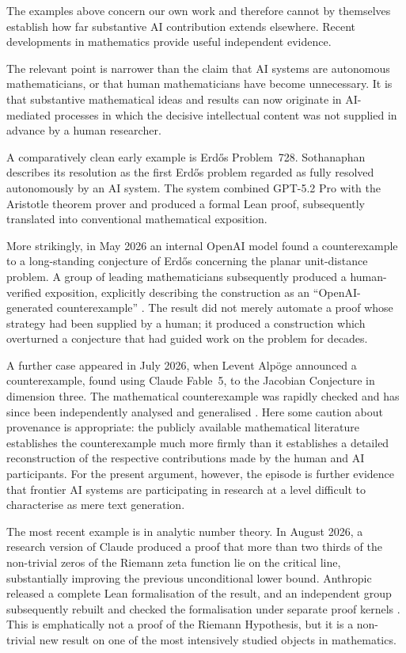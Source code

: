 The examples above concern our own work and therefore cannot by themselves establish how far substantive AI contribution extends elsewhere. Recent developments in mathematics provide useful independent evidence.

The relevant point is narrower than the claim that AI systems are autonomous mathematicians, or that human mathematicians have become unnecessary. It is that substantive mathematical ideas and results can now originate in AI-mediated processes in which the decisive intellectual content was not supplied in advance by a human researcher.

A comparatively clean early example is Erd\H{o}s Problem~728. Sothanaphan \citep{sothanaphan2026erdos728} describes its resolution as the first Erd\H{o}s problem regarded as fully resolved autonomously by an AI system. The system combined GPT-5.2 Pro with the Aristotle theorem prover and produced a formal Lean proof, subsequently translated into conventional mathematical exposition.

More strikingly, in May 2026 an internal OpenAI model found a counterexample to a long-standing conjecture of Erd\H{o}s concerning the planar unit-distance problem. A group of leading mathematicians subsequently produced a human-verified exposition, explicitly describing the construction as an ``OpenAI-generated counterexample'' \citep{alonEtAl2026unitdistance}. The result did not merely automate a proof whose strategy had been supplied by a human; it produced a construction which overturned a conjecture that had guided work on the problem for decades.

A further case appeared in July 2026, when Levent Alp\"oge announced a counterexample, found using Claude Fable~5, to the Jacobian Conjecture in dimension three. The mathematical counterexample was rapidly checked and has since been independently analysed and generalised \citep{gao2026jacobian,lee2026jacobian}. Here some caution about provenance is appropriate: the publicly available mathematical literature establishes the counterexample much more firmly than it establishes a detailed reconstruction of the respective contributions made by the human and AI participants. For the present argument, however, the episode is further evidence that frontier AI systems are participating in research at a level difficult to characterise as mere text generation.

The most recent example is in analytic number theory. In August 2026, a research version of Claude produced a proof that more than two thirds of the non-trivial zeros of the Riemann zeta function lie on the critical line, substantially improving the previous unconditional lower bound. Anthropic released a complete Lean formalisation of the result, and an independent group subsequently rebuilt and checked the formalisation under separate proof kernels \citep{claude2026zeta,riemannlabs2026zeta}. This is emphatically not a proof of the Riemann Hypothesis, but it is a non-trivial new result on one of the most intensively studied objects in mathematics.

